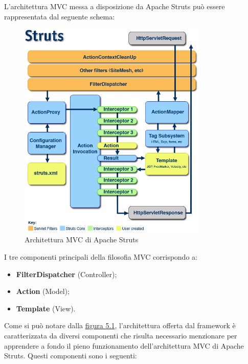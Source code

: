 \setlength{\parskip}{3ex}

\noindent L'architettura MVC messa a disposizione da Apache Struts può essere rappresentata dal seguente schema:

\begin{figure}[!h]
	\centering
	\includegraphics[width=9cm]{../images/MVC.png}
	\caption{Architettura MVC di Apache Struts}
	\label{fig:MVC}
\end{figure}

\setlength{\parskip}{3ex}

\noindent I tre componenti principali della filosofia MVC corrispondo a:
\begin{itemize}
\item \textbf{FilterDispatcher} (Controller);
\item \textbf{Action} (Model);
\item \textbf{Template} (View).
\end{itemize}

\noindent Come si può notare dalla {\hyperref[fig:MVC]{figura 5.1}}, l'architettura offerta dal framework è caratterizzata da diversi componenti che risulta necessario menzionare per apprendere a fondo il pieno funzionamento dell'architettura MVC di Apache Struts. Questi componenti sono i seguenti: 

